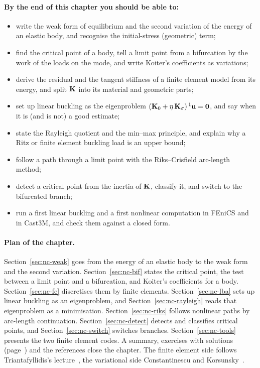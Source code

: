 \paragraph{By the end of this chapter you should be able to:}
\begin{itemize}
  \item write the weak form of equilibrium and the second variation of the energy of an
        elastic body, and recognise the initial-stress (geometric) term;
  \item find the critical point of a body, tell a limit point from a bifurcation by the work of the
        loads on the mode, and write Koiter's coefficients as variations;
  \item derive the residual and the tangent stiffness of a finite element model from
        its energy, and split $\mathbf{K}$ into its material and geometric parts;
  \item set up linear buckling as the eigenproblem $(\mathbf{K}_0 + \eta\,\mathbf{K}_\sigma)\,{}^1\mathbf{u} = \mathbf{0}$,
        and say when it is (and is not) a good estimate;
  \item state the Rayleigh quotient and the min--max principle, and explain why a
        Ritz or finite element buckling load is an upper bound;
  \item follow a path through a limit point with the Riks--Crisfield arc-length method;
  \item detect a critical point from the inertia of $\mathbf{K}$, classify it, and switch
        to the bifurcated branch;
  \item run a first linear buckling and a first nonlinear computation in FEniCS and in
        Cast3M, and check them against a closed form.
\end{itemize}

\paragraph{Plan of the chapter.}
Section~\ref{sec:nc-weak} goes from the energy of an elastic body to the weak form and
the second variation. Section~\ref{sec:nc-bif} states the critical point, the test between a
limit point and a bifurcation, and Koiter's coefficients for a body. Section~\ref{sec:nc-fe} discretises them by finite elements.
Section~\ref{sec:nc-lba} sets up linear buckling as an eigenproblem, and
Section~\ref{sec:nc-rayleigh} reads that eigenproblem as a minimisation.
Section~\ref{sec:nc-riks} follows nonlinear paths by arc-length continuation.
Section~\ref{sec:nc-detect} detects and classifies critical points, and
Section~\ref{sec:nc-switch} switches branches. Section~\ref{sec:nc-tools} presents the
two finite element codes. A summary, exercises with solutions
(page~\pageref{sec:nc-exo}) and the references close the chapter. The finite element
side follows Triantafyllidis's lecture~\cite{nc-triantafyllidis2018}, the variational
side Constantinescu and Korsunsky~\cite[Chapter~7]{nc-constantinescu2007}.

